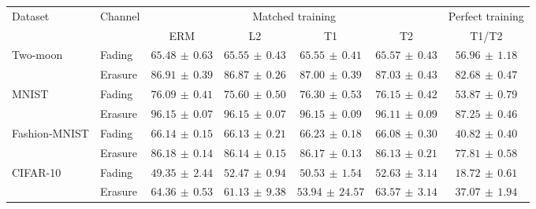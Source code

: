 \begin{tabular*}{\linewidth}{@{\extracolsep{\fill}}llccccc@{}}
\toprule
\multirow{2}{*}{Dataset} & \multirow{2}{*}{Channel} & \multicolumn{4}{c}{Matched training} & Perfect training \\
\cmidrule(lr){3-6}\cmidrule(l){7-7}
 & & ERM & L2 & T1 & T2 & T1/T2 \\
\midrule
\multirow{2}{*}{Two-moon} & Fading & $65.48\,\pm\,0.63$ & $65.55\,\pm\,0.43$ & $65.55\,\pm\,0.41$ & $\mathbf{65.57}\,\pm\,0.43$ & $56.96\,\pm\,1.18$ \\
 & Erasure & $86.91\,\pm\,0.39$ & $86.87\,\pm\,0.26$ & $87.00\,\pm\,0.39$ & $\mathbf{87.03}\,\pm\,0.43$ & $82.68\,\pm\,0.47$ \\
\midrule[0.25pt]
\multirow{2}{*}{MNIST} & Fading & $76.09\,\pm\,0.41$ & $75.60\,\pm\,0.50$ & $\mathbf{76.30}\,\pm\,0.53$ & $76.15\,\pm\,0.42$ & $53.87\,\pm\,0.79$ \\
 & Erasure & $\mathbf{96.15}\,\pm\,0.07$ & $96.15\,\pm\,0.07$ & $96.15\,\pm\,0.09$ & $96.11\,\pm\,0.09$ & $87.25\,\pm\,0.46$ \\
\midrule[0.25pt]
\multirow{2}{*}{Fashion-MNIST} & Fading & $66.14\,\pm\,0.15$ & $66.13\,\pm\,0.21$ & $\mathbf{66.23}\,\pm\,0.18$ & $66.08\,\pm\,0.30$ & $40.82\,\pm\,0.40$ \\
 & Erasure & $\mathbf{86.18}\,\pm\,0.14$ & $86.14\,\pm\,0.15$ & $86.17\,\pm\,0.13$ & $86.13\,\pm\,0.21$ & $77.81\,\pm\,0.58$ \\
\midrule[0.25pt]
\multirow{2}{*}{CIFAR-10} & Fading & $49.35\,\pm\,2.44$ & $52.47\,\pm\,0.94$ & $50.53\,\pm\,1.54$ & $\mathbf{52.63}\,\pm\,3.14$ & $18.72\,\pm\,0.61$ \\
 & Erasure & $\mathbf{64.36}\,\pm\,0.53$ & $61.13\,\pm\,9.38$ & $53.94\,\pm\,24.57$ & $63.57\,\pm\,3.14$ & $37.07\,\pm\,1.94$ \\
\bottomrule
\end{tabular*}
